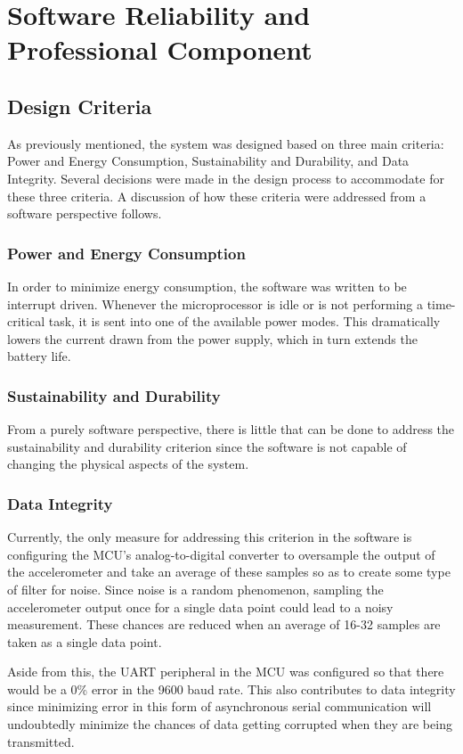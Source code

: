 \section{Software Reliability and Professional Component}

\subsection{Design Criteria}
As previously mentioned, the system was designed based on three main criteria: Power and Energy Consumption, Sustainability and Durability, and Data Integrity.  Several decisions were made in the design process to accommodate for these three criteria.  A discussion of how these criteria were addressed from a software perspective follows.

\subsubsection{Power and Energy Consumption}
In order to minimize energy consumption, the software was written to be interrupt driven.  Whenever the microprocessor is idle or is not performing a time-critical task, it is sent into one of the available power modes.  This dramatically lowers the current drawn from the power supply, which in turn extends the battery life.

\subsubsection{Sustainability and Durability}
From a purely software perspective, there is little that can be done to address the sustainability and durability criterion since the software is not capable of changing the physical aspects of the system.

\subsubsection{Data Integrity}
Currently, the only measure for addressing this criterion in the software is configuring the MCU's analog-to-digital converter to oversample the output of the accelerometer and take an average of these samples so as to create some type of filter for noise.  Since noise is a random phenomenon, sampling the accelerometer output once for a single data point could lead to a noisy measurement.  These chances are reduced when an average of 16-32 samples are taken as a single data point.

Aside from this, the UART peripheral in the MCU was configured so that there would be a 0\% error in the 9600 baud rate.  This also contributes to data integrity since minimizing error in this form of asynchronous serial communication will undoubtedly minimize the chances of data getting corrupted when they are being transmitted.

